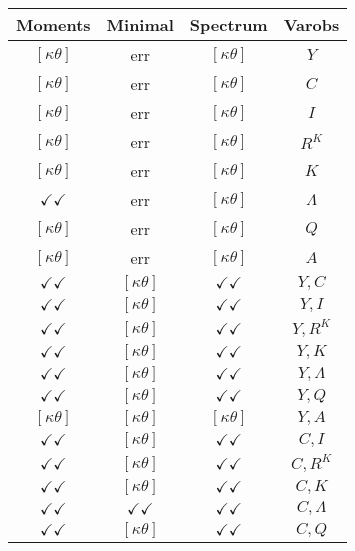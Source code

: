 \documentclass[a4paper,10pt]{article}
\begin{document}
\centering
\begin{longtable}{|c|c|c|c|}
\hline
Moments & Minimal & Spectrum & Varobs \\
\hline
$[\kappa \theta ]$ & err & $[\kappa \theta ]$ & ${Y}$ \\
\hline
$[\kappa \theta ]$ & err & $[\kappa \theta ]$ & ${C}$ \\
\hline
$[\kappa \theta ]$ & err & $[\kappa \theta ]$ & ${I}$ \\
\hline
$[\kappa \theta ]$ & err & $[\kappa \theta ]$ & ${R^{K}}$ \\
\hline
$[\kappa \theta ]$ & err & $[\kappa \theta ]$ & ${K}$ \\
\hline
$\checkmark\checkmark$ & err & $[\kappa \theta ]$ & ${\Lambda}$ \\
\hline
$[\kappa \theta ]$ & err & $[\kappa \theta ]$ & ${Q}$ \\
\hline
$[\kappa \theta ]$ & err & $[\kappa \theta ]$ & ${A}$ \\
\hline
$\checkmark\checkmark$ & $[\kappa \theta ]$ & $\checkmark\checkmark$ & ${Y},{C}$ \\
\hline
$\checkmark\checkmark$ & $[\kappa \theta ]$ & $\checkmark\checkmark$ & ${Y},{I}$ \\
\hline
$\checkmark\checkmark$ & $[\kappa \theta ]$ & $\checkmark\checkmark$ & ${Y},{R^{K}}$ \\
\hline
$\checkmark\checkmark$ & $[\kappa \theta ]$ & $\checkmark\checkmark$ & ${Y},{K}$ \\
\hline
$\checkmark\checkmark$ & $[\kappa \theta ]$ & $\checkmark\checkmark$ & ${Y},{\Lambda}$ \\
\hline
$\checkmark\checkmark$ & $[\kappa \theta ]$ & $\checkmark\checkmark$ & ${Y},{Q}$ \\
\hline
$[\kappa \theta ]$ & $[\kappa \theta ]$ & $[\kappa \theta ]$ & ${Y},{A}$ \\
\hline
$\checkmark\checkmark$ & $[\kappa \theta ]$ & $\checkmark\checkmark$ & ${C},{I}$ \\
\hline
$\checkmark\checkmark$ & $[\kappa \theta ]$ & $\checkmark\checkmark$ & ${C},{R^{K}}$ \\
\hline
$\checkmark\checkmark$ & $[\kappa \theta ]$ & $\checkmark\checkmark$ & ${C},{K}$ \\
\hline
$\checkmark\checkmark$ & $\checkmark\checkmark$ & $\checkmark\checkmark$ & ${C},{\Lambda}$ \\
\hline
$\checkmark\checkmark$ & $[\kappa \theta ]$ & $\checkmark\checkmark$ & ${C},{Q}$ \\

\end{longtable}
\end{document}
